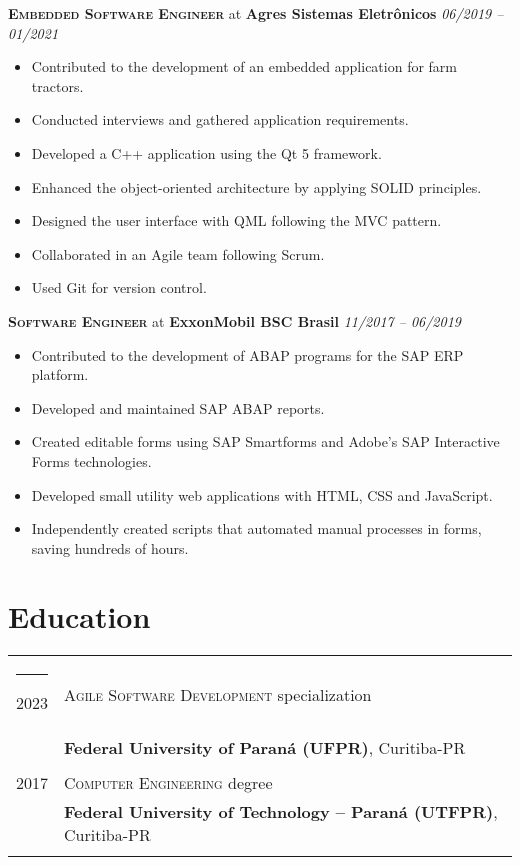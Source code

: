 \documentclass[a4paper,12pt]{article}
\begin{document}
{\large\textbf{\textsc{Embedded Software Engineer}}} at \textbf{Agres Sistemas Eletrônicos} \hfill \textit{06/2019 -- 01/2021}

{\small
\begin{itemize}[leftmargin=*]
    \setlength\itemsep{-0.2em}
    \item Contributed to the development of an embedded application for farm tractors.
    \item Conducted interviews and gathered application requirements.
    \item Developed a C++ application using the Qt 5 framework.
    \item Enhanced the object-oriented architecture by applying SOLID principles.
    \item Designed the user interface with QML following the MVC pattern.
    \item Collaborated in an Agile team following Scrum.
    \item Used Git for version control.
\end{itemize}
}

{\large\textbf{\textsc{Software Engineer}}} at \textbf{ExxonMobil BSC Brasil} \hfill \textit{11/2017 -- 06/2019}

{\small
\begin{itemize}[leftmargin=*]
    \setlength\itemsep{-0.2em}
    \item Contributed to the development of ABAP programs for the SAP ERP platform.
    \item Developed and maintained SAP ABAP reports.
    \item Created editable forms using SAP Smartforms and Adobe's SAP Interactive Forms technologies.
    \item Developed small utility web applications with HTML, CSS and JavaScript.
    \item Independently created scripts that automated manual processes in forms, saving hundreds of hours.
\end{itemize}
}
\section{Education}
\vspace{6pt}
\begin{tabular}{rl}

\rule{2cm}{0pt} 2023 & \textsc{Agile Software Development} specialization \\ &\normalsize\textbf{Federal University of Paraná (UFPR)}, Curitiba-PR\\&\\
2017 & \textsc{Computer Engineering} degree \\ &\normalsize\textbf{Federal University of Technology – Paraná (UTFPR)}, Curitiba-PR\\&\\
\end{tabular}
\end{document}
